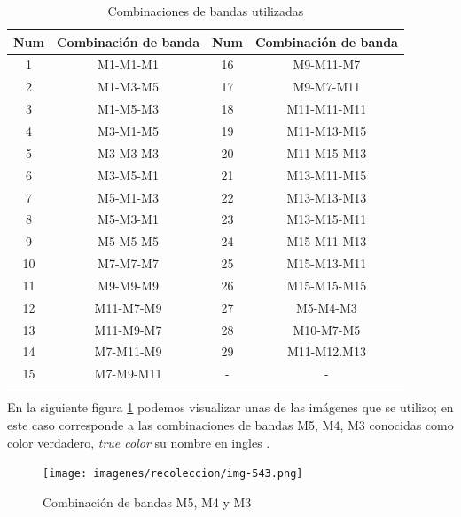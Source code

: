 \begin{table}[h] \begin{center}
\begin{tabular}{|c|c||c|c|}\hline 
\textbf{Num} & \textbf{Combinación de banda} & \textbf{Num} & \textbf{Combinación de banda} \\ \hline 
1  	& 	M1-M1-M1 			& 16  & 	M9-M11-M7  \\ \hline
2  	&   M1-M3-M5			& 17  & 	M9-M7-M11\\  \hline
3  	& 	M1-M5-M3			& 18  & 	M11-M11-M11\\ \hline
4  	&   M3-M1-M5 			& 19  & 	M11-M13-M15\\ \hline
5   & 	M3-M3-M3 			& 20  & 	M11-M15-M13\\ \hline
6   & 	M3-M5-M1 			& 21  & 	M13-M11-M15 \\ \hline
7   & 	M5-M1-M3 			& 22  & 	M13-M13-M13\\ \hline
8   & 	M5-M3-M1 			& 23  & 	M13-M15-M11\\ \hline
9   &   M5-M5-M5  			& 24  & 	M15-M11-M13\\ \hline
10  &	M7-M7-M7   			& 25  & 	M15-M13-M11\\ \hline
11  & 	M9-M9-M9   			& 26  & 	M15-M15-M15\\ \hline
12  & 	M11-M7-M9  			& 27  & 	M5-M4-M3\\ \hline
13  & 	M11-M9-M7  			& 28  & 	M10-M7-M5\\ \hline
14  &  	M7-M11-M9  			& 29  & 	M11-M12.M13\\ \hline
15  & 	M7-M9-M11  			& -& -\\ \hline      	
\end{tabular}
\end{center}\caption{Combinaciones de bandas utilizadas \label{tab:combinacion_banda}}
\end{table}

En la siguiente figura \ref{Fig: bandas543} podemos visualizar unas de las imágenes que se utilizo; en este caso corresponde  a las combinaciones de bandas M5, M4, M3 conocidas como color verdadero, \textit{true color} su nombre en ingles .

\begin{figure}[H]
 \centering
  \texttt{[image: imagenes/recoleccion/img-543.png]}
  \caption{Combinación de bandas M5, M4 y M3}
	\label{Fig: bandas543}
\end{figure}

